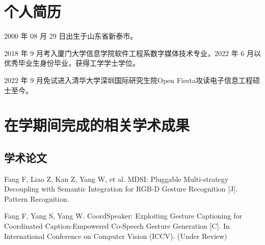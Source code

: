 
\begin{resume}

  \section*{个人简历}

  2000 年 08 月 29 日出生于山东省新泰市。

  2018 年 9 月考入厦门大学信息学院软件工程系数字媒体技术专业，2022 年 6 月以优秀毕业生身份毕业，获得工学学士学位。

  2022 年 9 月免试进入清华大学深圳国际研究生院Open Fiesta攻读电子信息工程硕士至今。


  \section*{在学期间完成的相关学术成果}

  \subsection*{学术论文}

  \begin{achievements}
    \item Fang F, Liao Z, Kan Z, Yang W, et al. MDSI: Pluggable Multi-strategy Decoupling with Semantic Integration for RGB-D Gesture Recognition [J]. 
    Pattern Recognition.
    \item Fang F, Yang S, Yang W. CoordSpeaker: Exploiting Gesture Captioning for Coordinated Caption-Empowered Co-Speech Gesture Generation [C]. In International Conference on Computer Vision (ICCV). (Under Review)
  \end{achievements}




\end{resume}
